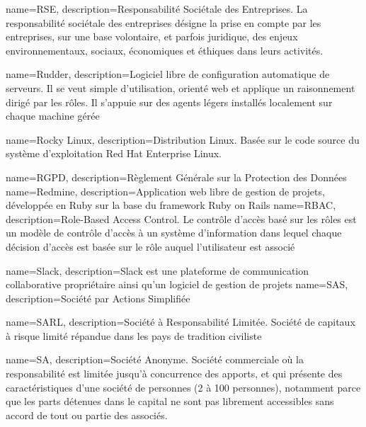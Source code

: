 {
    name=RSE,
    description={Responsabilité Sociétale des Entreprises. La responsabilité sociétale des entreprises désigne la prise en compte par les entreprises, sur une base volontaire, et parfois juridique, des enjeux environnementaux, sociaux, économiques et éthiques dans leurs activités.}
}

{
    name=Rudder,
    description={Logiciel libre de configuration automatique de serveurs. Il se veut simple d'utilisation, orienté web et applique un raisonnement dirigé par les rôles. Il s'appuie sur des agents légers installés localement sur chaque machine gérée}
}

{
    name=Rocky Linux,
    description={Distribution Linux. Basée sur le code source du système d'exploitation Red Hat Enterprise Linux.}
}

{
    name=RGPD,
    description={Règlement Générale sur la Protection des Données}
}
{
    name=Redmine,
    description={Application web libre de gestion de projets, développée en Ruby sur la base du framework Ruby on Rails}
}
{
    name=RBAC,
    description={Role-Based Access Control. Le contrôle d'accès basé sur les rôles est un modèle de contrôle d'accès à un système d'information dans lequel chaque décision d'accès est basée sur le rôle auquel l'utilisateur est associé}
}


{
    name=Slack,
    description={Slack est une plateforme de communication collaborative propriétaire ainsi qu'un logiciel de gestion de projets}
}
{
    name=SAS,
    description={Société par Actions Simplifiée}
}

{
    name=SARL,
    description={Société à Responsabilité Limitée. Société de capitaux à risque limité répandue dans les pays de tradition civiliste}
}

{
    name=SA,
    description={Société Anonyme. Société commerciale où la responsabilité est limitée jusqu'à concurrence des apports, et qui présente des caractéristiques d'une société de personnes (2 à 100 personnes), notamment parce que les parts détenues dans le capital ne sont pas librement accessibles sans accord de tout ou partie des associés. }
}

